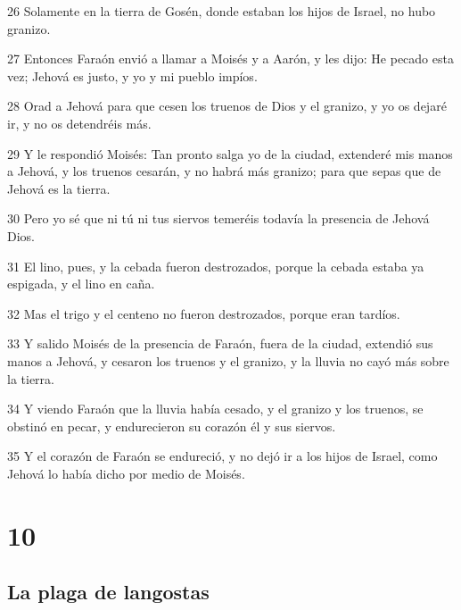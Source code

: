 \par 26 Solamente en la tierra de Gosén, donde estaban los hijos de Israel, no hubo granizo.
\par 27 Entonces Faraón envió a llamar a Moisés y a Aarón, y les dijo: He pecado esta vez; Jehová es justo, y yo y mi pueblo impíos.
\par 28 Orad a Jehová para que cesen los truenos de Dios y el granizo, y yo os dejaré ir, y no os detendréis más.
\par 29 Y le respondió Moisés: Tan pronto salga yo de la ciudad, extenderé mis manos a Jehová, y los truenos cesarán, y no habrá más granizo; para que sepas que de Jehová es la tierra.
\par 30 Pero yo sé que ni tú ni tus siervos temeréis todavía la presencia de Jehová Dios.
\par 31 El lino, pues, y la cebada fueron destrozados, porque la cebada estaba ya espigada, y el lino en caña.
\par 32 Mas el trigo y el centeno no fueron destrozados, porque eran tardíos.
\par 33 Y salido Moisés de la presencia de Faraón, fuera de la ciudad, extendió sus manos a Jehová, y cesaron los truenos y el granizo, y la lluvia no cayó más sobre la tierra.
\par 34 Y viendo Faraón que la lluvia había cesado, y el granizo y los truenos, se obstinó en pecar, y endurecieron su corazón él y sus siervos.
\par 35 Y el corazón de Faraón se endureció, y no dejó ir a los hijos de Israel, como Jehová lo había dicho por medio de Moisés.

\chapter{10}

\section*{La plaga de langostas}

